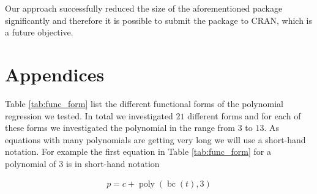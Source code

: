 \documentclass[12pt,a4paper]{article}
\DeclareMathOperator{\bc}{bc}
\DeclareMathOperator{\poly}{poly}
\begin{document}
Our approach successfully reduced the size of the aforementioned package
significantly and therefore it is possible to submit the package to
\ac{CRAN}, which is a future objective.

\pagebreak

\setcounter{page}{7}
\printbibliography[title = References]
\cleardoublepage

\begin{refsection}

\nocite{R-base}
\nocite{R-knitr}
\nocite{R-class}
\nocite{R-dplyr}
\nocite{R-glmnet}
\nocite{R-purrr}
\nocite{R-rstudioapi}
\nocite{R-stringr}
\nocite{R-tictoc}
\nocite{R-tidyr}
\nocite{R-Studio}
\nocite{wickham_readr_2021}
\nocite{wickham_ggplot2_2021}
\nocite{simpson_permute_2019}
\nocite{cetinkaya-rundel_openintro_2021}
\nocite{zhu_kableextra_2021}
\nocite{auguie_gridextra_2017}
\nocite{wilke_cowplot_2020}
\nocite{moritz_imputets_2021}
\nocite{narzo_tsdyn_2020}
\nocite{wallig_doparallel_2020}
\nocite{wallig_foreach_2020}
\nocite{muller_tibble_2021}
\nocite{wickham_pryr_2021}
\nocite{bache_magrittr_2020}
\nocite{vaughan_furrr_2021}


\printbibliography[title = Software-References]
\end{refsection}

\cleardoublepage
\appendix
\setcounter{table}{0}
\setcounter{figure}{0}
\renewcommand{\thetable}{A\arabic{table}}
\renewcommand{\thefigure}{A\arabic{figure}}


\hypertarget{appendices}{%
\section{Appendices}\label{appendices}}

Table \ref{tab:func_form} list the different functional forms of the
polynomial regression we tested. In total we investigated \(21\)
different forms and for each of these forms we investigated the
polynomial in the range from \(3\) to \(13\). As equations with many
polynomials are getting very long we will use a short-hand notation. For
example the first equation in Table \ref{tab:func_form} for a polynomial
of \(3\) is in short-hand notation

\begin{align}
    p = c + \poly\left( \bc(t), 3 \right)
\end{align}
\end{document}

